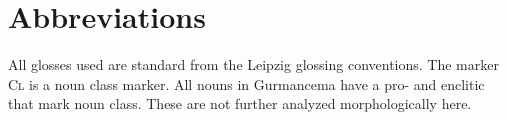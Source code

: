 \documentclass[output=paper,newtxmath,modfonts,nonflat,draftmode]{langsci/langscibook}
\begin{document}
\section*{Abbreviations}
All glosses used are standard from the Leipzig glossing conventions. The marker \textsc{Cl} is a noun class marker. All nouns in Gurmancema have a 
pro- and enclitic that mark noun class. These are not further analyzed morphologically here. 


\printbibliography[heading=subbibliography,notkeyword=this]
\end{document}
